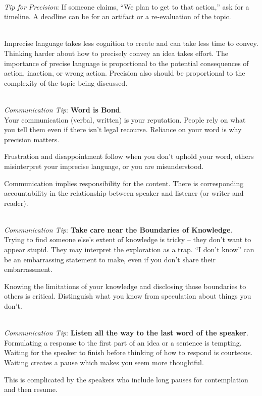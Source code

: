 \ \\
\textit{Tip for Precision}: If someone claims, ``We plan to get to that action,'' ask for a timeline. A deadline can be for an artifact or a re-evaluation of the topic.

\ \\
Imprecise language takes less cognition to create and can take less time to convey. Thinking harder about how to precisely convey an idea takes effort. 
The importance of precise language is proportional to the potential consequences of action, inaction, or wrong action.
Precision also should be proportional to the complexity of the topic being discussed. 

\ \\
\textit{Communication Tip}: \textbf{Word is Bond\label{sec:word-is-bond}}.\\
Your communication (verbal, written) is your reputation. People rely on what you tell them even if there isn't legal recourse. Reliance on your word is why precision matters. 

Frustration and disappointment follow when you don't uphold your word, others misinterpret your imprecise language, or you are misunderstood.

Communication implies responsibility for the content.  There is corresponding accountability in the relationship between speaker and listener (or writer and reader).

\ \\
\textit{Communication Tip}: \textbf{Take care near the Boundaries of Knowledge}.\\
Trying to find someone else's extent of knowledge is tricky -- they don't want to appear stupid. They may interpret the exploration as a trap. ``I don't know'' can be an embarrassing statement to make, even if you don't share their embarrassment. 

Knowing the limitations of your knowledge and disclosing those boundaries to others is critical. Distinguish what you know from speculation about things you don't. 

\ \\
\textit{Communication Tip}: \textbf{Listen all the way to the last word of the speaker}.\\
Formulating a response to the first part of an idea or a sentence is tempting. Waiting for the speaker to finish before thinking of how to respond is courteous. Waiting creates a pause which makes you seem more thoughtful. 

This is complicated by the speakers who include long pauses for contemplation and then resume. 


